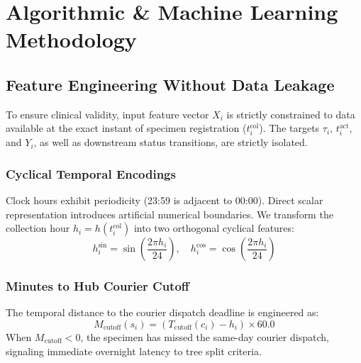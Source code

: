 \documentclass[conference]{IEEEtran}
\begin{document}
\section{Algorithmic \& Machine Learning Methodology}

\subsection{Feature Engineering Without Data Leakage}
To ensure clinical validity, input feature vector $X_i$ is strictly constrained to data available at the exact instant of specimen registration ($t_i^{\text{col}}$). The targets $\tau_i$, $t_i^{\text{act}}$, and $Y_i$, as well as downstream status transitions, are strictly isolated.

\subsubsection{Cyclical Temporal Encodings}
Clock hours exhibit periodicity (23:59 is adjacent to 00:00). Direct scalar representation introduces artificial numerical boundaries. We transform the collection hour $h_i = h(t_i^{\text{col}})$ into two orthogonal cyclical features:
\begin{equation}
h_i^{\sin} = \sin\left(\frac{2\pi h_i}{24}\right), \quad h_i^{\cos} = \cos\left(\frac{2\pi h_i}{24}\right)
\end{equation}

\subsubsection{Minutes to Hub Courier Cutoff}
The temporal distance to the courier dispatch deadline is engineered as:
\begin{equation}
M_{\text{cutoff}}(s_i) = \left( T_{\text{cutoff}}(c_i) - h_i \right) \times 60.0
\end{equation}
When $M_{\text{cutoff}} < 0$, the specimen has missed the same-day courier dispatch, signaling immediate overnight latency to tree split criteria.
\end{document}
